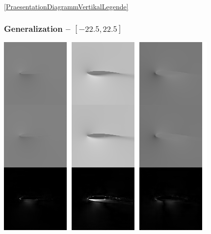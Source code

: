 \begin{frame}
\begin{center}

    \vspace*{-5mm}
    \ref*{PraesentationDiagrammVertikalLegende}%
\end{center}
\end{frame}
\clearpage

\begin{frame}
    \frametitle{Generalization -- $[-22.5, 22.5]$}
    \vspace*{.1cm}
\begin{multicols}{2}
	
	\includegraphics[width=.9\columnwidth, height=.6\textheight]{./Ressourcen/Praesentation/Bilder/TransferEval/std/0065_bw.png}%
    \vfill\columnbreak
    

\end{multicols}
\end{frame}
